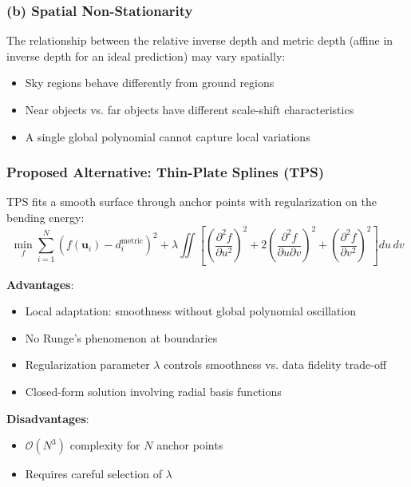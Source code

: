 \documentclass[11pt,a4paper]{article}
\begin{document}
\subsubsection{(b) Spatial Non-Stationarity}

The relationship between the relative inverse depth and metric depth (affine in inverse depth for an ideal prediction) may vary spatially:
\begin{itemize}[noitemsep]
    \item Sky regions behave differently from ground regions
    \item Near objects vs. far objects have different scale-shift characteristics
    \item A single global polynomial cannot capture local variations
\end{itemize}

\subsubsection{Proposed Alternative: Thin-Plate Splines (TPS)}

TPS fits a smooth surface through anchor points with regularization on the bending energy:
\begin{equation}
\min_f \sum_{i=1}^{N} \left(f(\mathbf{u}_i) - d_i^{\text{metric}}\right)^2 + \lambda \iint \left[ \left(\frac{\partial^2 f}{\partial u^2}\right)^2 + 2\left(\frac{\partial^2 f}{\partial u \partial v}\right)^2 + \left(\frac{\partial^2 f}{\partial v^2}\right)^2 \right] du\, dv
\end{equation}

\textbf{Advantages}:
\begin{itemize}[noitemsep]
    \item Local adaptation: smoothness without global polynomial oscillation
    \item No Runge's phenomenon at boundaries
    \item Regularization parameter $\lambda$ controls smoothness vs. data fidelity trade-off
    \item Closed-form solution involving radial basis functions
\end{itemize}

\textbf{Disadvantages}:
\begin{itemize}[noitemsep]
    \item $\mathcal{O}(N^3)$ complexity for $N$ anchor points
    \item Requires careful selection of $\lambda$
\end{itemize}
\end{document}

